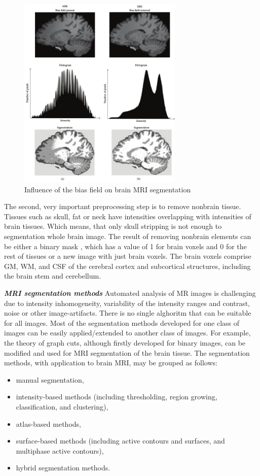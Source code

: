 \begin{figure}[H]
\centering{}\includegraphics[width=0.7\textwidth]{./figures/Module_09/m09_3}\caption{Influence of the bias field on brain MRI segmentation  \label{fig:figures/m09_3}}
\end{figure}

The second, very important preprocessing step is to remove nonbrain tissue. Tissues such as skull, fat or neck have intensities overlapping with intensities of brain tissues. Which means, that only skull stripping is not enough to segmentation whole brain image. The result of removing nonbrain elements can be either a binary mask , which has a value of 1 for brain voxels and 0 for the rest of tissues or a new image with just brain voxels. The brain voxels comprise GM, WM, and CSF of the cerebral cortex and subcortical structures, including the brain stem and cerebellum.


\textbf{\textit{MRI segmentation methods}}
Automated analysis of MR images is challenging due to intensity inhomogeneity, variability of the intensity ranges and contrast, noise or other image-artifacts. There is no single alghoritm that can be suitable for all images. Most of the segmentation methods developed for one class of images can be easily applied/extended to another class of images. For example, the theory of graph cuts, although firstly developed for binary images, can be modified and used for MRI segmentation of the brain tissue. The segmentation methods, with application to brain MRI, may be grouped as follows:
\begin{itemize}
\item manual segmentation, 
\item intensity-based methods (including thresholding, region growing, classification, and clustering),
\item atlas-based methods,
\item surface-based methods (including active contours and surfaces, and multiphase active contours),
\item hybrid segmentation methods.
\end{itemize}


